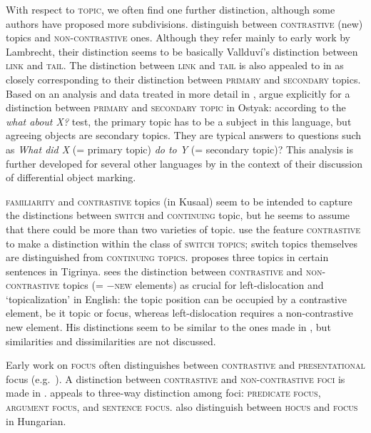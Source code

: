 \documentclass[output=paper,hidelinks]{langscibook}
\begin{document}
With respect to \textsc{topic}, we often find one further distinction, although some authors have proposed more subdivisions. \citet{BM87} distinguish between \textsc{contrastive} (new) topics and \textsc{non-contrastive} ones. Although they refer mainly to early work by Lambrecht, their distinction seems to be basically Vallduv\'{i}'s distinction between \textsc{link} and \textsc{tail}. The distinction between \textsc{link} and \textsc{tail} is also appealed to in \citet{DN} as closely corresponding to their distinction between \textsc{primary} and \textsc{secondary} topics. Based on an analysis and data treated in more detail in  \citet{Nikolaeva2000}, \citet{DN05} argue explicitly for a distinction between \textsc{primary} and \textsc{secondary topic} in Ostyak: according to the \textit{what about X?} test, the primary topic has to be a subject in this language, but agreeing objects are secondary topics. They are typical answers to questions such as \textit{What did X} (= primary topic) \textit{do to Y} (= secondary topic)? This analysis is further developed for several other languages by \citet{DN} in the context of their discussion of differential object marking.

 \textsc{familiarity} and \textsc{contrastive} topics (in Kusaal) seem to be intended to capture the distinctions between \textsc{switch} and \textsc{continuing} topic, but he seems to assume that there could be more than two varieties of topic. \citet{MMF05} use the feature \pm\textsc{contrastive} to make a distinction with\-in the class of \textsc{switch topics}; switch topics themselves are distinguished from \textsc{continuing topics}. \citet{Kifle11} proposes three topics in certain sentences in Tigrinya. \citet{Szucs2014} sees the distinction between \textsc{contrastive} and \textsc{non-con\-tras\-tive} topics (= \textsc{$-$new} elements) as crucial for left-dislocation and `topicalization' in English: the topic position can be occupied by a contrastive element, be it topic or focus, whereas left-dislocation requires a non-contrastive new element. His distinctions seem to be similar to the ones made in \citet{MMF05}, but similarities and dissimilarities are not discussed.

Early work on \textsc{focus} often distinguishes between \textsc{contrastive} and \textsc{presentational} focus (e.g.\ \citealt{King95}). A distinction between \textsc{contrastive} and \textsc{non-contrastive foci} is made in \citet{Abubakari}. \citet{Dalstrom03} appeals to  three-way distinction among foci: \textsc{predicate focus}, \textsc{argument focus}, and \textsc{sentence focus}. \citet{GazdikKomlosy2011} also distinguish between \textsc{hocus} and \textsc{focus} in Hungarian.
\end{document}
